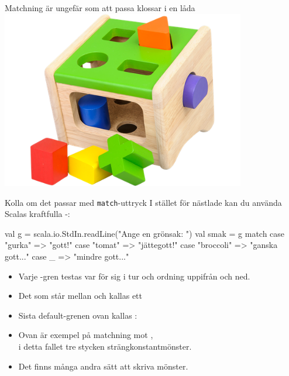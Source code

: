 \ifkompendium\else
\begin{SlideExtra}{Matchning är ungefär som att passa klossar i en låda}
\includegraphics[width=0.8\textwidth]{../img/plocklada.png}
\end{SlideExtra}
\fi


\begin{Slide}{Kolla om det passar med \texttt{match}-uttryck}\SlideFontSmall
I stället för nästlade  kan du använda Scalas kraftfulla -:

\begin{Code}
val g = scala.io.StdIn.readLine("Ange en grönsak: ")
val smak = g match 
  case "gurka"    => "gott!"
  case "tomat"    => "jättegott!"
  case "broccoli" => "ganska gott..."
  case _ => "mindre gott..."
\end{Code}
\begin{itemize}
\pause\item Varje -gren testas var för sig i tur och ordning uppifrån och ned.
\item Det som står mellan  och \code{=>} kallas ett  
\item Sista default-grenen ovan kallas : 
\item Ovan är exempel på matchning mot , \\ i detta fallet tre stycken strängkonstantmönster.
\item Det finns många andra sätt att skriva mönster.
\end{itemize}

\end{Slide}


